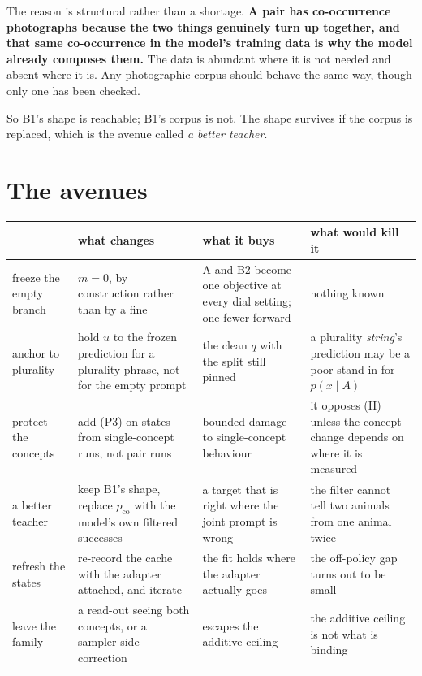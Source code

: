 \documentclass[11pt]{article}
\begin{document}
The reason is structural rather than a shortage. \textbf{A pair has co-occurrence photographs
because the two things genuinely turn up together, and that same co-occurrence in the model's
training data is why the model already composes them.} The data is abundant where it is not needed
and absent where it is. Any photographic corpus should behave the same way, though only one has
been checked.

So B1's shape is reachable; B1's corpus is not. The shape survives if the corpus is replaced, which
is the avenue called \emph{a better teacher}.

\section{The avenues}
\label{sec:avenues}

\begin{center}
\small
\begin{tabular}{p{} p{} p{} p{}}
\toprule
 & what changes & what it buys & what would kill it \\
\midrule
freeze the empty branch &
$m = 0$, by construction rather than by a fine &
A and B2 become one objective at every dial setting; one fewer forward &
nothing known \\[3pt]
anchor to plurality &
hold $u$ to the frozen prediction for a plurality phrase, not for the empty prompt &
the clean $q$ with the split still pinned &
a plurality \emph{string}'s prediction may be a poor stand-in for $p(x\mid A)$ \\[3pt]
protect the concepts &
add (P3) on states from single-concept runs, not pair runs &
bounded damage to single-concept behaviour &
it opposes (H) unless the concept change depends on where it is measured \\[3pt]
a better teacher &
keep B1's shape, replace $p_{\mathrm{co}}$ with the model's own filtered successes &
a target that is right where the joint prompt is wrong &
the filter cannot tell two animals from one animal twice \\[3pt]
refresh the states &
re-record the cache with the adapter attached, and iterate &
the fit holds where the adapter actually goes &
the off-policy gap turns out to be small \\[3pt]
leave the family &
a read-out seeing both concepts, or a sampler-side correction &
escapes the additive ceiling &
the additive ceiling is not what is binding \\
\bottomrule
\end{tabular}
\end{center}
\end{document}
